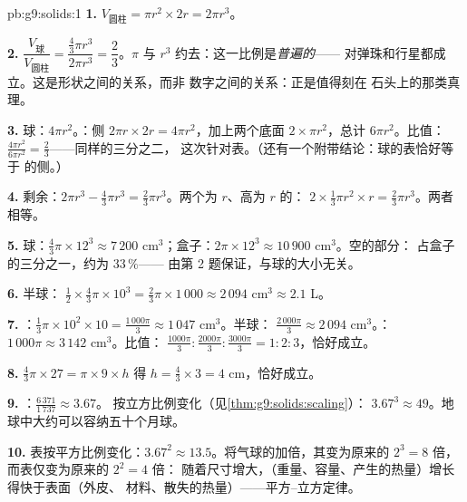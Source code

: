 \begin{solution}{pb:g9:solids:1}
\textbf{1.} $V_{\text{圆柱}} = \pi r^2 \times 2r = 2\pi r^3$。

\textbf{2.} $\dfrac{V_{\text{球}}}{V_{\text{圆柱}}}
= \dfrac{\frac43 \pi r^3}{2 \pi r^3} = \dfrac23$。$\pi$ 与
$r^3$ 约去：这一比例是\emph{普遍的}——
对弹珠和行星都成立。这是形状之间的关系，而非
数字之间的关系：正是值得刻在
石头上的那类真理。

\textbf{3.} 球：$4\pi r^2$。：侧
$2\pi r \times 2r = 4\pi r^2$，加上两个底面
$2 \times \pi r^2$，总计 $6\pi r^2$。比值：
$\frac{4\pi r^2}{6\pi r^2} = \frac23$——同样的三分之二，
这次针对表。（还有一个附带结论：球的表恰好等于
的侧。）

\textbf{4.} 剩余：$2\pi r^3 - \frac43\pi r^3 =
\frac23 \pi r^3$。两个为 $r$、高为 $r$ 的：
$2 \times \frac13 \pi r^2 \times r = \frac23 \pi r^3$。两者相等。

\textbf{5.} 球：$\frac43 \pi \times 12^3 \approx 7\,200$
cm$^3$；盒子：$2\pi \times 12^3 \approx 10\,900$ cm$^3$。空的部分：
占盒子的三分之一，约为 $33\,\%$——
由第 2 题保证，与球的大小无关。

\textbf{6.} 半球：
$\frac12 \times \frac43 \pi \times 10^3 = \frac23 \pi \times
1\,000 \approx 2\,094$ cm$^3 \approx 2.1$ L。

\textbf{7.} ：$\frac13 \pi \times 10^2 \times 10 =
\frac{1\,000\pi}{3} \approx 1\,047$ cm$^3$。半球：
$\frac{2\,000\pi}{3} \approx 2\,094$ cm$^3$。：
$1\,000\pi \approx 3\,142$ cm$^3$。比值：
$\frac{1000\pi}{3} : \frac{2000\pi}{3} : \frac{3000\pi}{3}
= 1 : 2 : 3$，恰好成立。

\textbf{8.} $\frac43 \pi \times 27 = \pi \times 9 \times h$
得 $h = \frac43 \times 3 = 4$ cm，恰好成立。

\textbf{9.} ：$\frac{6\,371}{1\,737} \approx 3.67$。
按立方比例变化（见\cref{thm:g9:solids:scaling}）：
$3.67^3 \approx 49$。地球中大约可以容纳五十个月球。

\textbf{10.} 表按平方比例变化：$3.67^2 \approx
13.5$。将气球的加倍，其变为原来的
$2^3 = 8$ 倍，而表仅变为原来的 $2^2 = 4$ 倍：
随着尺寸增大，（重量、容量、产生的热量）增长得快于表面（外皮、
材料、散失的热量）——平方--立方定律。


\end{solution}
